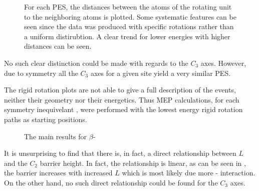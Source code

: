 \begin{figure}[h]
\begin{center}
    \parbox{0.85\linewidth}{
      \caption{For each PES, the distances between the  atoms of the rotating  unit to the neighboring  atoms is plotted.
Some systematic features can be seen since the data was produced with specific rotations rather than a uniform distirubtion.
A clear trend for lower energies with higher distances can be seen.
      }
      \label{fig:h-mg-distances}
    }
\end{center}
\end{figure}

No such clear distinction could be made with regards to the $C_3$ axes.
However, due to symmetry all the $C_3$ axes for a given site yield a very similar PES.

The rigid rotation plots are not able to give a full description of the events, neither their geometry nor their energetics.
Thus MEP calculations, for each symmetry inequivelant , were performed with the lowest energy rigid rotation paths as starting positions.

\begin{figure}[h]
\begin{center}
\caption{The main results for $\beta$- 
}
\label{fig:mg-results}
\end{center}
\end{figure}

It is unsurprising to find that there is, in fact, a direct relationship between $L$ and the $C_2$ barrier height.
In fact, the relationship is linear, as can be seen in , the barrier increases with increased $L$ which is most likely due more - interaction.
On the other hand, no such direct relationship could be found for the $C_3$ axes.

\expand


